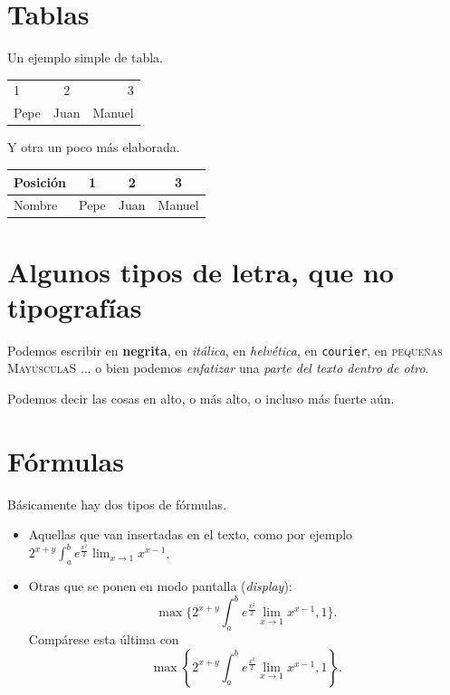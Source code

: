 \documentclass[11pt]{amsart}
\begin{document}
\section{Tablas} 

Un ejemplo simple de tabla.

\begin{tabular}{lcr}
1 & 2 & 3 \\
Pepe & Juan & Manuel
\end{tabular}

Y otra un poco más elaborada.

\begin{tabular}{l||c|c|c|} \hline
Posición & 1 & 2 & 3 \\ \hline \hline
Nombre & Pepe & Juan & Manuel\\ \hline
\end{tabular}


\section{Algunos tipos de letra, que no tipografías}

Podemos escribir en  \textbf{negrita}, en \textit{itálica}, en \textsl{helvética}, en \texttt{courier}, en \textsc{pequeñas MayúsculaS} ... o bien podemos \emph{enfatizar} una \textit{parte del texto \emph{dentro} de otro}.

Podemos decir las cosas en {\large alto}, o más {\Large alto}, o incluso {\huge más} fuerte {\Huge aún}.


\section{Fórmulas}

Básicamente hay dos tipos de fórmulas.
\begin{itemize}
\item Aquellas que van insertadas en el texto, como por ejemplo $2^{x+y}\int_a^b e^{\frac{x^2}{2}}\lim_{x\to 1}x^{x-1}$.
\item Otras que se ponen en modo pantalla (\emph{display}): \[\max\{2^{x+y}\int_a^b e^{\frac{x^2}{2}}\lim_{x\to 1}x^{x-1},1\}.\]
Compárese esta última con 
\[\max\left\{2^{x+y}\int_a^b e^{\frac{x^2}{2}}\lim_{x\to 1}x^{x-1},1\right\}.\]
\end{itemize}
\end{document}
